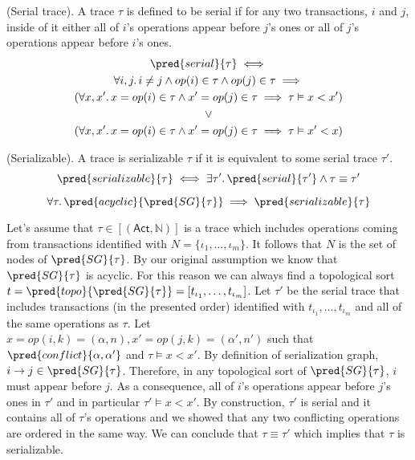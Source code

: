  (Serial trace). A trace $\tau$ is defined to be serial if for any two transactions, $i$ and $j$, inside of it either all of $i$'s operations appear before $j$'s ones or all of $j$'s operations appear before $i$'s ones.
\begin{gather*}
	\pred{serial}{\tau} \iff \\
	\forall i, j \ldotp i \neq j \land op(i) \in \tau \land op(j) \in \tau \implies \\
	(\forall x, x' \ldotp x = op(i) \in \tau \land x' = op(j) \in \tau \implies \tau \vDash x < x') \\
	\lor \\
	(\forall x, x' \ldotp x = op(i) \in \tau \land x' = op(j) \in \tau \implies \tau \vDash x' < x)
\end{gather*}

 (Serializable). A trace is serializable $\tau$ if it is equivalent to some serial trace $\tau'$.
\[
	\pred{serializable}{\tau} \iff \exists \tau' \ldotp \pred{serial}{\tau'} \land \tau \equiv \tau'
\]

\thm
\[
	\forall \tau \ldotp \pred{acyclic}{\pred{SG}{\tau}} \implies \pred{serializable}{\tau}
\]

Let's assume that $\tau \in [(\mathsf{Act}, \mathds{N})]$ is a trace which includes operations coming from transactions identified with $N = \{ \iota_1, \ldots, \iota_m \}$. It follows that $N$ is the set of nodes of $\pred{SG}{\tau}$. By our original assumption we know that $\pred{SG}{\tau}$ is acyclic. For this reason we can always find a topological sort $t = \pred{topo}{\pred{SG}{\tau}} = [t_{\iota_1}, \ldots, t_{\iota_m}]$. Let $\tau'$ be the serial trace that includes transactions (in the presented order) identified with $t_{\iota_1}, \ldots, t_{\iota_m}$ and all of the same operations as $\tau$. Let $x = op(i, k) = (\alpha, n), x' = op(j, k) = (\alpha', n')$ such that $\pred{conflict}{\alpha, \alpha'}$ and $\tau \vDash x < x'$. By definition of serialization graph, $i \rightarrow j \in \pred{SG}{\tau}$. Therefore, in any topological sort of $\pred{SG}{\tau}$, $i$ must appear before $j$. As a consequence, all of $i$'s operations appear before $j$'s ones in $\tau'$ and in particular $\tau' \vDash x < x'$. By construction, $\tau'$ is serial and it contains all of $\tau$'s operations and we showed that any two conflicting operations are ordered in the same way. We can conclude that $\tau \equiv \tau'$ which implies that $\tau$ is serializable.